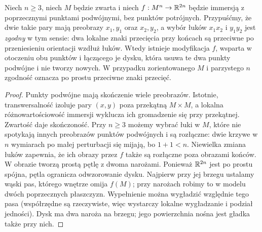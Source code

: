 \begin{stwierdzenie}
\label{lem:dysk-whitneya-15}
Niech $n\geq3$, niech $M$ będzie zwarta i niech
$f:M^n\to\mathbb{R}^{2n}$ będzie immersją z poprzecznymi punktami
podwójnymi, bez punktów potrójnych.
Przypuśćmy, że dwie takie pary mają
preobrazy $x_1,y_1$ oraz $x_2,y_2$,
a wybór łuków $x_1x_2$ i $y_1y_2$
jest \emph{zgodny} w tym sensie:
dwa lokalne znaki przecięcia przy końcach
są przeciwne po przeniesieniu orientacji
wzdłuż łuków. Wtedy istnieje modyfikacja
$f$, wsparta w otoczeniu obu punktów
i łączącego je dysku, która usuwa
te dwa punkty podwójne i nie tworzy nowych.
W przypadku zorientowanego $M$ i parzystego
$n$ zgodność oznacza po prostu przeciwne
znaki przecięć.
\end{stwierdzenie}
\begin{proof}
Punkty podwójne mają skończenie wiele preobrazów.
Istotnie, transwersalność izoluje pary $(x,y)$ poza
przekątną $M\times M$, a lokalna różnowartościowość
immersji wyklucza ich gromadzenie się przy przekątnej.
Zwartość daje skończoność.
Przy $n\geq3$ możemy wybrać łuki w $M$,
które nie spotykają innych preobrazów
punktów podwójnych i są rozłączne:
dwie krzywe w $n$ wymiarach po małej perturbacji
się mijają, bo $1+1<n$. Niewielka
zmiana łuków zapewnia, że ich obrazy
przez $f$ także są rozłączne poza
obrazami końców. W obrazie tworzą
prostą pętlę z dwoma narożami.
Ponieważ $\mathbb{R}^{2n}$ jest po prostu spójna,
pętla ogranicza odwzorowanie dysku. Najpierw przy
jej brzegu ustalamy wąski pas, którego wnętrze
omija $f(M)$; przy narożach robimy to w modelu
dwóch poprzecznych płaszczyzn. Wypełnienie można
wygładzić względnie tego pasa (współrzędne są
rzeczywiste, więc wystarczy lokalne wygładzanie
i podział jedności). Dysk ma dwa naroża na brzegu;
jego powierzchnia nośna jest gładka także przy nich.


\end{proof}
